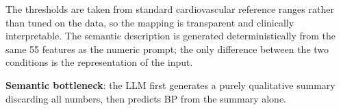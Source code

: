 The thresholds are taken from standard cardiovascular reference ranges rather than tuned on the data, so the mapping is transparent and clinically interpretable. The semantic description is generated deterministically from the same 55 features as the numeric prompt; the only difference between the two conditions is the representation of the input.

\textbf{Semantic bottleneck}: the LLM first generates a purely qualitative summary discarding all numbers, then predicts BP from the summary alone.
